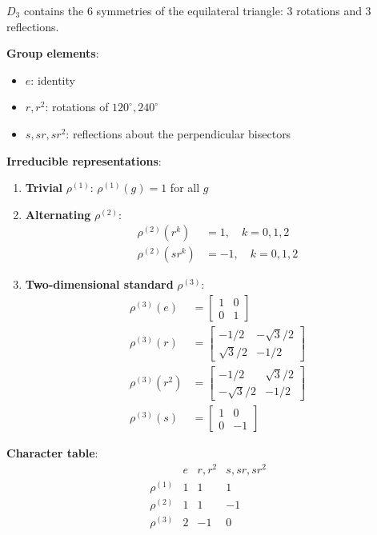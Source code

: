 \begin{example}\label{ex:grupo_d3_detallado}
$D_3$ contains the 6 symmetries of the equilateral triangle: 3 rotations and 3 reflections.

\textbf{Group elements}:
\begin{itemize}
    \item $e$: identity
    \item $r, r^2$: rotations of $120^\circ, 240^\circ$
    \item $s, sr, sr^2$: reflections about the perpendicular bisectors
\end{itemize}

\textbf{Irreducible representations}:
\begin{enumerate}
    \item \textbf{Trivial} $\rho^{(1)}$: $\rho^{(1)}(g) = 1$ for all $g$
    \item \textbf{Alternating} $\rho^{(2)}$:
    \begin{align}
    \rho^{(2)}(r^k) &= 1, \quad k = 0,1,2 \\
    \rho^{(2)}(sr^k) &= -1, \quad k = 0,1,2
    \end{align}
    \item \textbf{Two-dimensional standard} $\rho^{(3)}$:
    \begin{align}
    \rho^{(3)}(e) &= \begin{bmatrix} 1 & 0 \\ 0 & 1 \end{bmatrix} \\
    \rho^{(3)}(r) &= \begin{bmatrix} -1/2 & -\sqrt{3}/2 \\ \sqrt{3}/2 & -1/2 \end{bmatrix} \\
    \rho^{(3)}(r^2) &= \begin{bmatrix} -1/2 & \sqrt{3}/2 \\ -\sqrt{3}/2 & -1/2 \end{bmatrix} \\
    \rho^{(3)}(s) &= \begin{bmatrix} 1 & 0 \\ 0 & -1 \end{bmatrix}
    \end{align}
\end{enumerate}

\textbf{Character table}:
\begin{equation}
\begin{array}{c|ccc}
 & e & r, r^2 & s, sr, sr^2 \\
\hline
\rho^{(1)} & 1 & 1 & 1 \\
\rho^{(2)} & 1 & 1 & -1 \\
\rho^{(3)} & 2 & -1 & 0
\end{array}
\end{equation}
\end{example}

